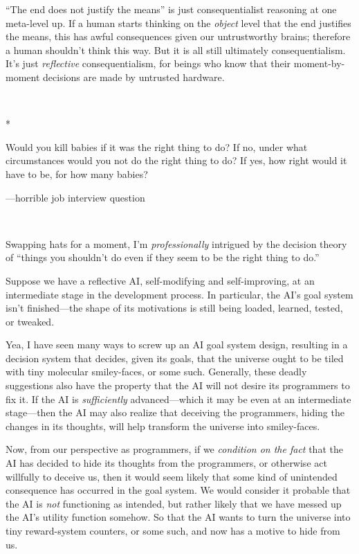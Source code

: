 {
 ``The end does not justify the
means'' is just consequentialist reasoning at one
meta-level up. If a human starts thinking on the \textit{object} level
that the end justifies the means, this has awful consequences given our
untrustworthy brains; therefore a human shouldn't think
this way. But it is all still ultimately consequentialism.
It's just \textit{reflective} consequentialism, for
beings who know that their moment-by-moment decisions are made by
untrusted hardware.}

{\centering
 \ ~
\par}

{\centering
 *
\par}


{
 Would you kill babies if it was the right thing to do? If no,
under what circumstances would you not do the right thing to do? If
yes, how right would it have to be, for how many babies?}

{\raggedleft
 {}---horrible job interview question
\par}


\bigskip

{
 ~}

{
 Swapping hats for a moment, I'm
\textit{professionally} intrigued by the decision theory of
``things you shouldn't do even if they
seem to be the right thing to do.''}

{
 Suppose we have a reflective AI, self-modifying and
self-improving, at an intermediate stage in the development process. In
particular, the AI's goal system isn't
finished---the shape of its motivations is still being loaded, learned,
tested, or tweaked.}

{
 Yea, I have seen many ways to screw up an AI goal system design,
resulting in a decision system that decides, given its goals, that the
universe ought to be tiled with tiny molecular smiley-faces, or some
such. Generally, these deadly suggestions also have the property that
the AI will not desire its programmers to fix it. If the AI is
\textit{sufficiently} advanced---which it may be even at an
intermediate stage---then the AI may also realize that deceiving the
programmers, hiding the changes in its thoughts, will help transform
the universe into smiley-faces.}

{
 Now, from our perspective as programmers, if we \textit{condition
on the fact} that the AI has decided to hide its thoughts from the
programmers, or otherwise act willfully to deceive us, then it would
seem likely that some kind of unintended consequence has occurred in
the goal system. We would consider it probable that the AI is
\textit{not} functioning as intended, but rather likely that we have
messed up the AI's utility function somehow. So that
the AI wants to turn the universe into tiny reward-system counters, or
some such, and now has a motive to hide from us.}

